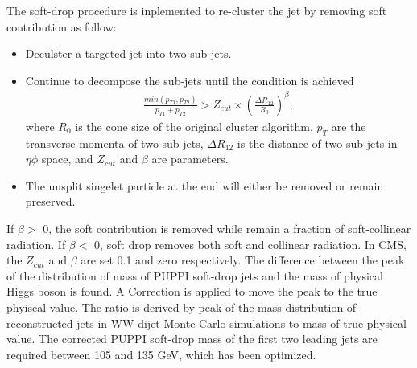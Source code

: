 The soft-drop procedure is inplemented to re-cluster the jet by removing soft contribution as follow:
\begin{itemize}
\item Deculster a targeted jet into two sub-jets.
\item Continue to decompose the sub-jets until the condition is achieved
\begin{equation} \label{eq5}
\begin{split}
\frac{min(p_{T1},p_{T2})}{p_{T1}+p_{T2}} > Z_{cut} \times (\frac{\Delta R_{12}}{R_0})^{\beta}, 
\end{split}
\end{equation}
where $R_0$ is the cone size of the original cluster algorithm, $p_T$ are the transverse momenta of two sub-jets, $\Delta R_{12}$ is the distance of two sub-jets in $\eta \phi$ space, and $Z_{cut}$ and $\beta $ are parameters. 
\item The unsplit singelet particle at the end will either be removed or remain preserved.
\end{itemize} 
If $\beta  >$ 0, the soft contribution is removed while remain a fraction of soft-collinear radiation. 
If $\beta  <$ 0, soft drop removes both soft and collinear radiation.
In CMS, the $Z_{cut}$ and $\beta $ are set 0.1 and zero respectively.
The difference between the peak of the distribution of mass of PUPPI soft-drop jets and the mass of physical Higgs boson is found.
A Correction is applied to move the peak to the true phyiscal value. 
The ratio is derived by peak of the mass distribution of reconstructed jets in WW dijet Monte Carlo simulations to mass of true physical value.
The corrected PUPPI soft-drop mass of the first two leading jets are required between 105 and 135 GeV, which has been optimized.
 
